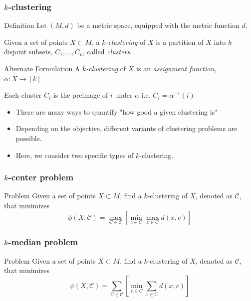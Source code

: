 \documentclass{beamer}
\begin{document}
\begin{frame}
\frametitle{$k$-clustering}

\begin{block}{Definition}
Let $(M, d)$ be a metric space, equipped with the metric function $d$.

Given a set of points $X \subset M$, a {\it $k$-clustering} of $X$ is a partition of $X$ into $k$ disjoint subsets, $C_1, \dots, C_k$, called {\it clusters}.
\end{block} \pause

\begin{block}{Alternate Formulation}
A {\it $k$-clustering} of $X$ is an {\it assignment function}, $\alpha: X \rightarrow [k]$.

Each cluster $C_i$ is the preimage of $i$ under $\alpha$ i.e. $C_i = \alpha^{-1}(i)$
\end{block}

\begin{itemize} \pause
    \item There are many ways to quantify "how good a given clustering is"
    \item Depending on the objective, different variants of clustering problems are possible.
    \item Here, we consider two specific types of $k$-clustering.
\end{itemize}
\end{frame}



\begin{frame}
\frametitle{$k$-center problem}

\begin{block}{Problem}
Given a set of points $X \subset M$, find a $k$-clustering of $X$, denoted as $\mathcal{C}$, that minimizes
$$\phi(X, \mathcal{C}) = \max_{C \in \mathcal{C}} \left[ \min_{c \in C} \max_{x \in C} d(x, c) \right]$$
\end{block}
\end{frame}



\begin{frame}
\frametitle{$k$-median problem}

\begin{block}{Problem}
Given a set of points $X \subset M$, find a $k$-clustering of $X$, denoted as $\mathcal{C}$, that minimizes
$$\psi(X, \mathcal{C}) = \sum_{C \in \mathcal{C}} \left[ \min_{c \in C} \sum_{x \in C} d(x, c) \right]$$
\end{block}
\end{frame}
\end{document}
